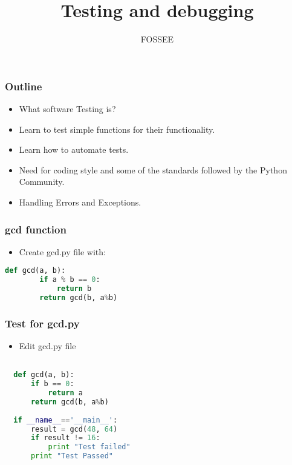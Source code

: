 \documentclass[presentation]{beamer}
\title{Testing and debugging}
\author{FOSSEE}
\date{}
\begin{document}
\maketitle









\begin{frame}
\frametitle{Outline}
\label{sec-1}

\begin{itemize}
\item What software Testing is?
\item Learn to test simple functions for their functionality.
\item Learn how to automate tests.
\item Need for coding style and some of the standards followed by the Python Community.
\item Handling Errors and Exceptions.
\end{itemize}
\end{frame}
\begin{frame}[fragile]
\frametitle{gcd function}
\label{sec-2}

\begin{itemize}
\item Create gcd.py file with:
\end{itemize}

\begin{lstlisting}[language=python]
  def gcd(a, b):
        if a % b == 0: 
            return b
        return gcd(b, a%b)
\end{lstlisting}
\end{frame}
\begin{frame}[fragile]
\frametitle{Test for gcd.py}
\label{sec-3}

\begin{itemize}
\item Edit gcd.py file
\end{itemize}

\begin{lstlisting}[language=python]

  def gcd(a, b):
      if b == 0:
          return a
      return gcd(b, a%b)
  
  if __name__=='__main__':
      result = gcd(48, 64)
      if result != 16:
          print "Test failed"
      print "Test Passed"
\end{lstlisting}
\end{frame}
\end{document}
